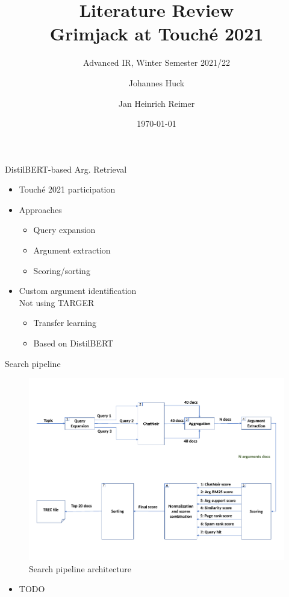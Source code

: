 \documentclass[english]{mlutalk}
\title{Literature Review\\Grimjack at Touché 2021}
\subtitle{Advanced IR, Winter Semester 2021/22}
\author{Johannes Huck \and Jan Heinrich Reimer}
\institute{Martin Luther University Halle-Wittenberg}
\date{\today}
\begin{document}
\titleframe

\begin{frame}{DistilBERT-based Arg. Retrieval~\cite{AlhamzehBEM2021}}
  \begin{itemize}
    \item Touché 2021 participation
    \item Approaches
    \begin{itemize}
      \item Query expansion
      \item Argument extraction
      \item Scoring/sorting
    \end{itemize}
    \item Custom argument identification \\ Not using TARGER~\cite{ChernodubOHBHBP2019}
    \begin{itemize}
      \item Transfer learning
      \item Based on DistilBERT~\cite{SanhDCW2019}
    \end{itemize}
  \end{itemize}
\end{frame}

\begin{frame}[allowframebreaks]{Search pipeline}
  \begin{figure}
    \centering
    \includegraphics[width=0.8\linewidth]{figures/distilbert-based-arg-retrieval-architecture.pdf}
    \caption{Search pipeline architecture~\cite{AlhamzehBEM2021}}
    \label{architecture}
  \end{figure}

  \begin{itemize}
    \item TODO
  \end{itemize}
\end{frame}
\end{document}
